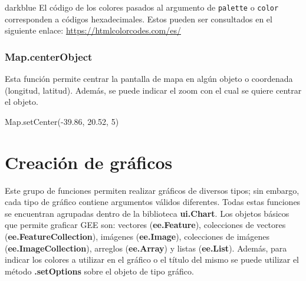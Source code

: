 \documentclass[
  12pt,
  letterpaper,
  twoside]{book}
\newenvironment{Shaded}{\begin{snugshade}}{\end{snugshade}}
\newcommand{\BuiltInTok}[1]{#1}
\newcommand{\DecValTok}[1]{\textcolor[rgb]{0.28,0.53,0.93}{#1}}
\newcommand{\FloatTok}[1]{\textcolor[rgb]{0.28,0.53,0.93}{#1}}
\newcommand{\FunctionTok}[1]{\textcolor[rgb]{0.48,0.12,0.64}{#1}}
\newcommand{\NormalTok}[1]{#1}
\newcommand{\OperatorTok}[1]{\textcolor[rgb]{0.00,0.00,0.00}{#1}}
\newcommand\boldpurple[1]{\textcolor{darkpurple}{\textbf{#1}}}
\begin{document}
\begin{bluebox2}

\begin{awesomeblock}{5pt}{\faLightbulb}{darkblue}
El código de los colores pasados al argumento de \texttt{palette} o \texttt{color} corresponden a códigos hexadecimales. Estos pueden ser consultados en el siguiente enlace: \url{https://htmlcolorcodes.com/es/}

\end{awesomeblock}

\end{bluebox2}

\hypertarget{map.centerobject}{%
\subsubsection*{Map.centerObject}\label{map.centerobject}}

Esta función permite centrar la pantalla de mapa en algún objeto o coordenada (longitud, latitud). Además, se puede indicar el zoom con el cual se quiere centrar el objeto.

\begin{Shaded}
\begin{Highlighting}[]
\BuiltInTok{Map}\OperatorTok{.}\FunctionTok{setCenter}\NormalTok{(}\OperatorTok{{-}}\FloatTok{39.86}\OperatorTok{,} \FloatTok{20.52}\OperatorTok{,} \DecValTok{5}\NormalTok{)}
\end{Highlighting}
\end{Shaded}

\hypertarget{creaciuxf3n-de-gruxe1ficos}{%
\section{Creación de gráficos}\label{creaciuxf3n-de-gruxe1ficos}}

Este grupo de funciones permiten realizar gráficos de diversos tipos; sin embargo, cada tipo de gráfico contiene argumentos válidos diferentes. Todas estas funciones se encuentran agrupadas dentro de la biblioteca \boldpurple{ui.Chart}. Los objetos básicos que permite graficar GEE son: vectores (\boldpurple{ee.Feature}), colecciones de vectores (\boldpurple{ee.FeatureCollection}), imágenes (\boldpurple{ee.Image}), colecciones de imágenes (\boldpurple{ee.ImageCollection}), arreglos (\boldpurple{ee.Array}) y listas (\boldpurple{ee.List}). Además, para indicar los colores a utilizar en el gráfico o el título del mismo se puede utilizar el método \boldpurple{.setOptions} sobre el objeto de tipo gráfico.
\end{document}
